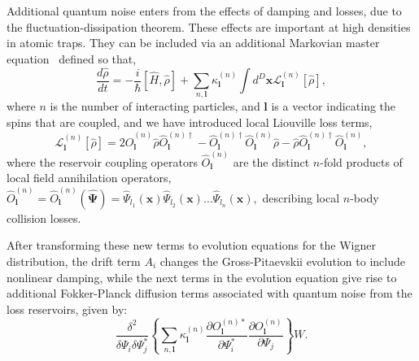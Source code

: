 \documentclass[aps,prl,twocolumn,showpacs,amsmath,amssymb,superscriptaddress,flushbottom,noraggedfooter]{revtex4-1}
\newcommand{\xvec}{\boldsymbol{x}}
\newcommand{\lvec}{\boldsymbol{l}}
\newcommand{\Psivec}{\boldsymbol{\Psi}}
\begin{document}
Additional quantum noise enters from the effects of damping and losses,
due to the fluctuation-dissipation theorem.
These effects are important at high densities in atomic traps.
They can be included via an additional Markovian master equation~\cite{Jack2002}
defined so that,
\begin{equation}
	\frac{d\hat{\rho}}{dt} =
		- \frac{i}{\hbar} \left[ \hat{H}, \hat{\rho} \right]
		+ \sum_{n,\lvec} \kappa_{\lvec}^{(n)} \int d^{D}\xvec
			\mathcal{L}_{\lvec}^{(n)} \left[ \hat{\rho} \right],
\end{equation}
where $n$ is the number of interacting particles,
and $\lvec$ is a vector indicating the spins that are coupled,
and we have introduced local Liouville loss terms,
\begin{equation}
	\mathcal{L}_{\lvec}^{(n)} \left[ \hat{\rho} \right] =
		2\hat{O}_{\lvec}^{(n)} \hat{\rho} \hat{O}_{\lvec}^{(n)\dagger}
		- \hat{O}_{\lvec}^{(n)\dagger} \hat{O}_{\lvec}^{(n)} \hat{\rho}
		- \hat{\rho} \hat{O}_{\lvec}^{(n)\dagger} \hat{O}_{\lvec}^{(n)},
\end{equation}
where the reservoir coupling operators $\hat{O}_{\lvec}^{(n)}$ are the distinct $n$-fold products of local field annihilation operators,
$\hat{O}_{\lvec}^{(n)} = \hat{O}_{\lvec}^{(n)} (\widehat{\Psivec}) =
	\widehat{\Psi}_{l_{1}} (\xvec)
	\widehat{\Psi}_{l_{2}} (\xvec) \ldots
	\widehat{\Psi}_{l_{n}} (\xvec),$
describing local $n$-body collision losses.

After transforming these new terms to evolution equations for the Wigner distribution, the drift term $A_{i}$
changes the Gross-Pitaevskii evolution to include nonlinear damping, while
the next terms in the evolution equation give rise to additional Fokker-Planck
diffusion terms associated with quantum noise from the loss reservoirs,
given by:
\begin{equation}
	\frac{\delta^{2}}{\delta\Psi_{i}\delta\Psi_{j}^{*}} \left\{
		\sum_{n,\lvec} \kappa_{\lvec}^{(n)}
			\frac{\partial O_{\lvec}^{(n)*}}{\partial\Psi_{i}^{*}}
			\frac{\partial O_{\lvec}^{(n)}}{\partial\Psi_{j}}
		\right\} W.
\end{equation}
\end{document}
